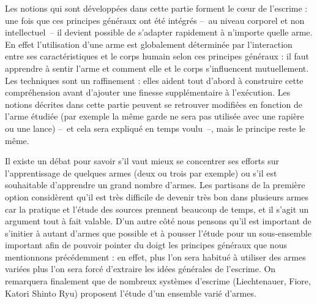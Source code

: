 Les notions qui sont développées dans cette partie forment le cœur de l'escrime : une fois que ces principes généraux ont été intégrés -- au niveau corporel et non intellectuel -- il devient possible de s'adapter rapidement à n'importe quelle arme.
En effet l'utilisation d'une arme est globalement déterminée par l'interaction entre ses caractéristiques et le corps humain selon ces principes généraux : il faut apprendre à sentir l'arme et comment elle et le corps s'influencent mutuellement.
Les techniques sont un raffinement : elles aident tout d'abord à construire cette compréhension avant d'ajouter une finesse supplémentaire à l'exécution.
Les notions décrites dans cette partie peuvent se retrouver modifiées en fonction de l'arme étudiée (par exemple la même garde ne sera pas utilisée avec une rapière ou une lance) -- et cela sera expliqué en temps voulu --, mais le principe reste le même.

Il existe un débat pour savoir s'il vaut mieux se concentrer ses efforts sur l'apprentissage de quelques armes (deux ou trois par exemple) ou s'il est souhaitable d'apprendre un grand nombre d'armes.
Les partisans de la première option considèrent qu'il est très difficile de devenir très bon dans plusieurs armes car la pratique et l'étude des sources prennent beaucoup de temps, et il s'agit un argument tout à fait valable.
D'un autre côté nous pensons qu'il est important de s'initier à autant d'armes que possible et à pousser l'étude pour un sous-ensemble important afin de pouvoir pointer du doigt les principes généraux que nous mentionnons précédemment : en effet, plus l'on sera habitué à utiliser des armes variées plus l'on sera forcé d'extraire les idées générales de l'escrime.
On remarquera finalement que de nombreux systèmes d'escrime (Liechtenauer, Fiore, Katori Shinto Ryu) proposent l'étude d'un ensemble varié d'armes.


